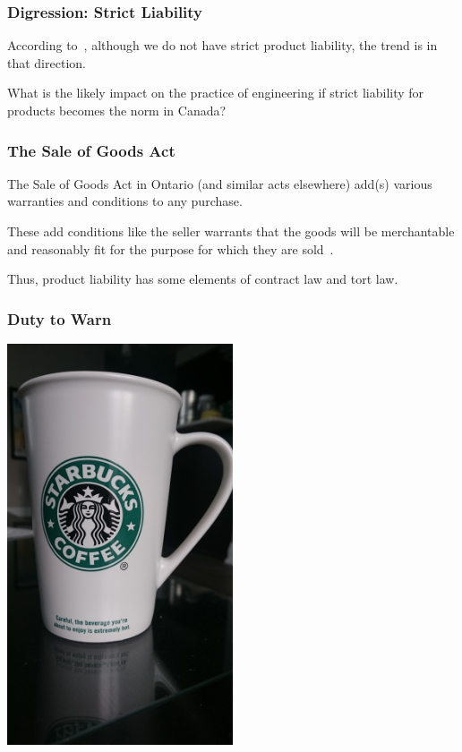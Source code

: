 \begin{frame}
\frametitle{Digression: Strict Liability}

According to~\cite{lpe}, although we do not have strict product liability, the trend is in that direction.

What is the likely impact on the practice of engineering if strict liability for products becomes the norm in Canada?

\end{frame}



\begin{frame}
\frametitle{The Sale of Goods Act}

The Sale of Goods Act in Ontario (and similar acts elsewhere) add(s) various warranties and conditions to any purchase.

These add conditions like the seller warrants that the goods will be merchantable and reasonably fit for the purpose for which they are sold~\cite{lpe}.

Thus, product liability has some elements of contract law and tort law.

\end{frame}



\begin{frame}
\frametitle{Duty to Warn}

\begin{center}
	\includegraphics[width=0.5\textwidth]{images/coffeemug.jpg}
\end{center}

\end{frame}



